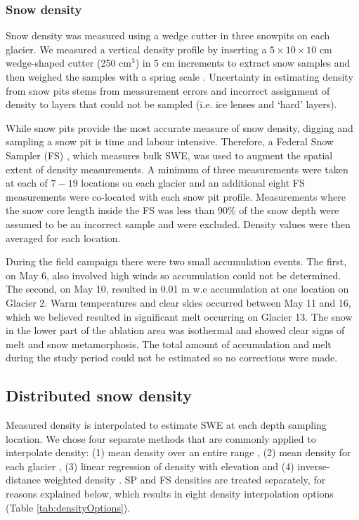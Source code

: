 \documentclass[review,oneside, letterpaper]{igs}
\begin{document}
\subsubsection{Snow density}

Snow density was measured using a wedge cutter in three snowpits on each glacier. We measured a vertical density profile by inserting a $5\times10\times 10$ cm wedge-shaped cutter (250 cm$^3$) in 5 cm increments to extract snow samples and then weighed the samples with a spring scale \citep[e.g.][]{Gray1981,Fierz2009}. Uncertainty in estimating density from snow pits stems from measurement errors and incorrect assignment of density to layers that could not be sampled (i.e. ice lenses and `hard' layers). 

While snow pits provide the most accurate measure of snow density, digging and sampling a snow pit is time and labour intensive. Therefore, a Federal Snow Sampler (FS) \citep{Clyde1932}, which measures bulk SWE, was used to augment the spatial extent of density measurements. A minimum of three measurements were taken at each of $7-19$ locations on each glacier and an additional eight FS measurements were co-located with each snow pit profile. Measurements where the snow core length inside the FS was less than 90\% of the snow depth were assumed to be an incorrect sample and were excluded. Density values were then averaged for each location. 

During the field campaign there were two small accumulation events. The first, on May 6, also involved high winds so accumulation could not be determined. The second, on May 10, resulted in 0.01 m w.e accumulation at one location on Glacier 2. Warm temperatures and clear skies occurred between May 11 and 16, which we believed resulted in significant melt occurring on Glacier 13. The snow in the lower part of the ablation area was isothermal and showed clear signs of melt and snow metamorphosis. The total amount of accumulation and melt during the study period could not be estimated so no corrections were made. 

\subsection{Distributed snow density}

Measured density is interpolated to estimate SWE at each depth sampling location. We chose four separate methods that are commonly applied to interpolate density: (1) mean density over an entire range \citep[e.g.][]{Cullen2017}, (2) mean density for each glacier \citep[e.g.][]{Elder1991, McGrath2015}, (3) linear regression of density with elevation \citep[e.g.][]{Elder1998, Molotch2005} and (4) inverse-distance weighted density \citep[e.g.][]{Molotch2005}.  SP and FS densities are treated separately, for reasons explained below, which results in eight density interpolation options (Table \ref{tab:densityOptions}).
\end{document}
